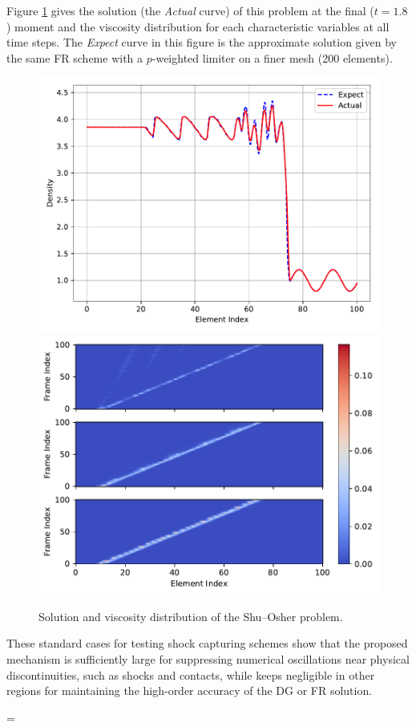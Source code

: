 \documentclass[10pt,draft]{article}
\begin{document}
Figure \ref{fig:shu_osher} gives the solution (the \emph{Actual} curve) of this problem at the final ($t=1.8$) moment and the viscosity distribution for each characteristic variables at all time steps.
The \emph{Expect} curve in this figure is the approximate solution given by the same FR scheme with a $p$-weighted limiter \cite{Li_2020} on a finer mesh (200 elements).
\begin{figure}[H]
  \centering
  \includegraphics[width=.49\textwidth]{./shu_osher/final/Frame100.pdf}
  \includegraphics[width=.49\textwidth]{./shu_osher/final/Viscosity.pdf}
  \caption{Solution and viscosity distribution of the Shu--Osher problem.}
  \label{fig:shu_osher}
\end{figure}

These standard cases for testing shock capturing schemes show that the proposed mechanism is sufficiently large for suppressing numerical oscillations near physical discontinuities, such as shocks and contacts, while keeps negligible in other regions for maintaining the high-order accuracy of the DG or FR solution.

\bibspacing=


\end{document}
